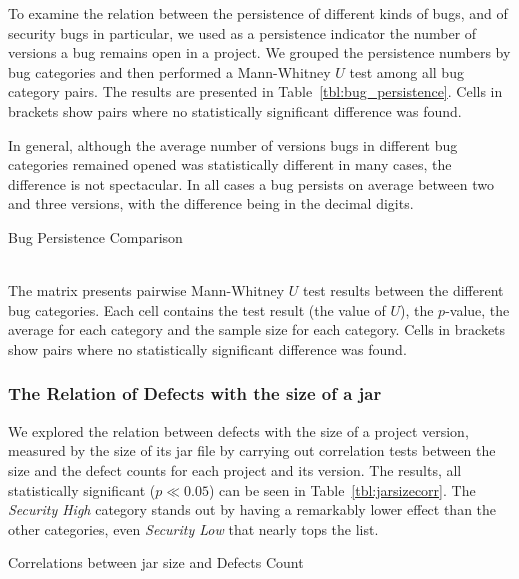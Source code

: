 \documentclass[conference]{llncs}
\begin{document}
To examine the relation between the persistence of different kinds of
bugs, and of security bugs in particular, we used as a persistence
indicator the number of versions a bug remains open in a project. We
grouped the persistence numbers by bug categories and then performed a
Mann-Whitney $U$ test among all bug category pairs. The results are
presented in Table~\ref{tbl:bug_persistence}. Cells in brackets show
pairs where no statistically significant difference was found.

In general, although the average number of versions bugs in different
bug categories remained opened was statistically different in many
cases, the difference is not spectacular. In all cases a bug persists
on average between two and three versions, with the difference being
in the decimal digits.

\begin{landscape}
  \begin{table}
    \setlength{\extrarowheight}{0.10cm}
    \caption{Bug Persistence Comparison}
    \label{tbl:bug_persistence}
    \resizebox{0.95\columnwidth}{!}{
    }\\
    The matrix presents pairwise Mann-Whitney $U$ test results
    between the different bug categories. Each cell contains the test
    result (the value of $U$), the $p$-value, the average for each
    category and the sample size for each category. Cells in brackets show
    pairs where no statistically significant difference was found.
  \end{table}
\end{landscape}

\subsubsection{The Relation of Defects with the size of a {\sc jar}}

We explored the relation between defects with the size of a project version,
measured by the size of its {\sc jar} file by carrying out correlation tests
between the size and the defect counts for each project and its
version. The results, all statistically significant ($p \ll
0.05$) can be seen in Table~\ref{tbl:jarsizecorr}. The {\it Security
  High} category stands out by having a remarkably lower effect than
the other categories, even {\it Security Low} that nearly tops the
list. 

\begin{table}
    \centering
    \caption{Correlations between jar size and Defects Count}
    \label{tbl:jarsizecorr}
    
\end{table}
\end{document}
